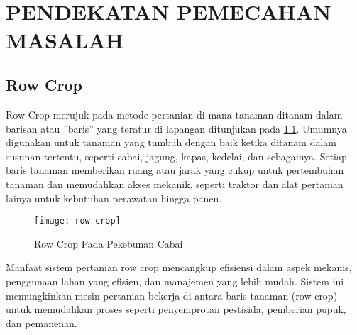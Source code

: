
\chapter[PENDEKATAN PEMECAHAN MASALAH]{\\ PENDEKATAN PEMECAHAN MASALAH}

\section{Row Crop}
Row Crop merujuk pada metode pertanian di mana tanaman ditanam dalam
barisan atau ”baris” yang teratur di lapangan ditunjukan pada \cref{fig:row}. Umumnya digunakan untuk tanaman yang tumbuh dengan baik ketika ditanam dalam susunan tertentu, seperti cabai, jagung, kapas, kedelai, dan sebagainya. Setiap baris tanaman memberikan ruang atau jarak yang cukup untuk pertembuhan tanaman dan memudahkan akses mekanik, seperti traktor dan alat pertanian lainya untuk kebutuhan perawatan hingga panen.

\begin{figure}[H]
	\centering
	\texttt{[image: row-crop]}
	\caption{Row Crop Pada Pekebunan Cabai}
	\label{fig:row}
\end{figure}

Manfaat sistem pertanian row crop mencangkup efisiensi dalam aspek mekanis, penggunaan lahan yang efisien, dan manajemen yang lebih mudah. Sistem ini memungkinkan mesin pertanian bekerja di antara baris tanaman (row crop) untuk memudahkan proses seperti penyemprotan pestisida, pemberian
pupuk, dan pemanenan.


